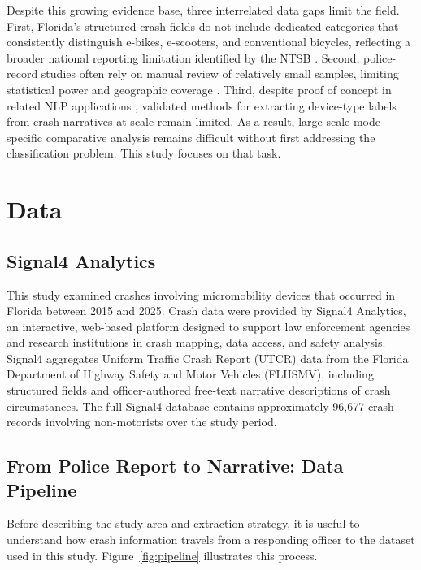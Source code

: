 \documentclass[numbered]{trbunofficial}
\begin{document}
Despite this growing evidence base, three interrelated data gaps limit the field. First, Florida's structured crash fields do not include dedicated categories that consistently distinguish e-bikes, e-scooters, and conventional bicycles, reflecting a broader national reporting limitation identified by the NTSB \citep{NTSB2022}. Second, police-record studies often rely on manual review of relatively small samples, limiting statistical power and geographic coverage \citep{Shah2021}. Third, despite proof of concept in related NLP applications \citep{Sayed2021,Ioannides2022,Oliaee2023}, validated methods for extracting device-type labels from crash narratives at scale remain limited. As a result, large-scale mode-specific comparative analysis remains difficult without first addressing the classification problem. This study focuses on that task.


\section{Data}
\label{sec:data}

\subsection{Signal4 Analytics}

This study examined crashes involving micromobility devices that occurred in Florida between 2015 and 2025. Crash data were provided by Signal4 Analytics, an interactive, web-based platform designed to support law enforcement agencies and research institutions in crash mapping, data access, and safety analysis. Signal4 aggregates Uniform Traffic Crash Report (UTCR) data from the Florida Department of Highway Safety and Motor Vehicles (FLHSMV), including structured fields and officer-authored free-text narrative descriptions of crash circumstances. The full Signal4 database contains approximately 96,677 crash records involving non-motorists over the study period.

\subsection{From Police Report to Narrative: Data Pipeline}

Before describing the study area and extraction strategy, it is useful to understand how crash information travels from a responding officer to the dataset used in this study. Figure~\ref{fig:pipeline} illustrates this process.
\end{document}
